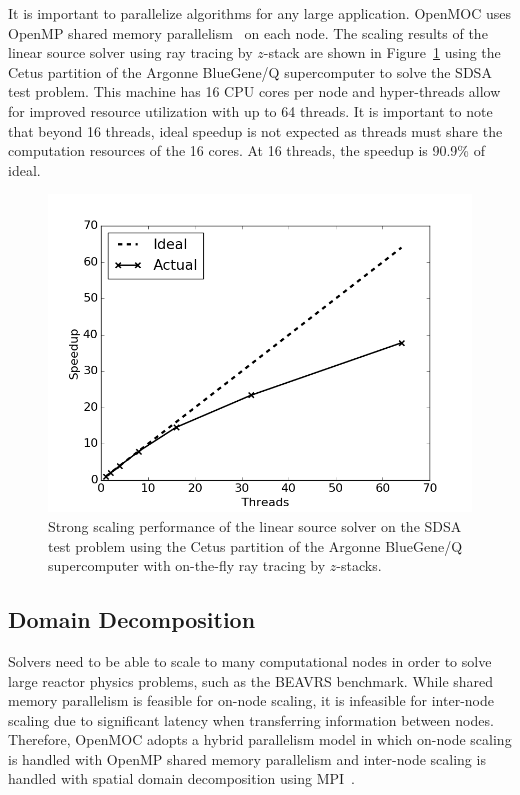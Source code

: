 \documentclass[12pt,twoside]{mitthesis-exec}
\begin{document}
It is important to parallelize algorithms for any large application. OpenMOC uses OpenMP shared memory parallelism~\cite{openmp} on each node. The scaling results of the linear source solver using ray tracing by $z$-stack are shown in Figure~\ref{fig:rt-parallel-ls-cetus} using the Cetus partition of the Argonne BlueGene/Q supercomputer to solve the SDSA test problem. This machine has 16 CPU cores per node and hyper-threads allow for improved resource utilization with up to 64 threads. It is important to note that beyond 16 threads, ideal speedup is not expected as threads must share the computation resources of the 16 cores. At 16 threads, the speedup is 90.9\% of ideal.

\begin{figure}[ht!]
	\centering
	\includegraphics[width=0.75\linewidth]{figures/results/performance/ls-parallel-scaling-stacks-cetus.png}
	\caption{Strong scaling performance of the linear source solver on the SDSA test problem using the Cetus partition of the Argonne BlueGene/Q supercomputer with on-the-fly ray tracing by $z$-stacks.}
	\label{fig:rt-parallel-ls-cetus}
\end{figure}


\newpage
\subsection*{Domain Decomposition}

Solvers need to be able to scale to many computational nodes in order to solve large reactor physics problems, such as the BEAVRS benchmark. While shared memory parallelism is feasible for on-node scaling, it is infeasible for inter-node scaling due to significant latency when transferring information between nodes. Therefore, OpenMOC adopts a hybrid parallelism model in which on-node scaling is handled with OpenMP shared memory parallelism and inter-node scaling is handled with spatial domain decomposition using MPI~\cite{mpi}.
\end{document}
